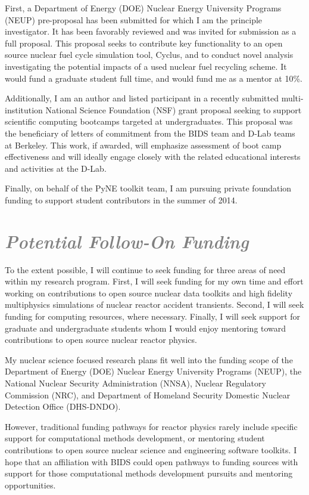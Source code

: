 \documentclass[a4paper, 10pt]{article}
\begin{document}
First, a Department of Energy (DOE) Nuclear Energy University Programs (NEUP) 
pre-proposal has been submitted for which I am the principle investigator. It 
has been favorably reviewed and was invited for submission as a full proposal. 
This proposal seeks to contribute key functionality to an open source nuclear 
fuel cycle simulation tool, Cyclus, and to conduct novel analysis investigating 
the potential impacts of a used nuclear fuel recycling scheme. It would fund a 
graduate student full time, and would fund me as a mentor at 10\%. 

Additionally, I am an author and listed participant in a recently submitted 
multi-institution National Science Foundation (NSF) grant proposal seeking to 
support scientific computing bootcamps targeted at undergraduates. This proposal 
was the beneficiary of letters of commitment from the BIDS team and D-Lab teams 
at Berkeley. This work, if awarded, will emphasize assessment of boot camp 
effectiveness and will ideally engage closely with the related educational 
interests and activities at the D-Lab.

Finally, on behalf of the PyNE toolkit team, I am pursuing private foundation 
funding to support student contributors in the summer of 2014.

\section*{\textcolor{gray}{\it Potential Follow-On Funding }}

To the extent possible, I will continue to seek funding for three areas of need 
within my research program. First, I will seek funding for my own time and 
effort working on contributions to open source nuclear data toolkits and high 
fidelity multiphysics simulations of nuclear reactor accident transients. 
Second, I will seek funding for computing resources, where necessary. Finally, I 
will seek support for graduate and undergraduate students whom I would enjoy 
mentoring toward contributions to open source nuclear reactor physics. 

My nuclear science focused research plans fit well into the funding scope of the 
Department of Energy (DOE) Nuclear Energy University Programs (NEUP), the 
National Nuclear Security Administration (NNSA), Nuclear Regulatory Commission 
(NRC), and Department of Homeland Security Domestic Nuclear Detection Office 
(DHS-DNDO).  

However, traditional funding pathways for reactor physics rarely include 
specific support for computational methods development, or mentoring student 
contributions to open source nuclear science and engineering software toolkits. 
I hope that an affiliation with BIDS could open pathways to funding sources with 
support for those computational methods development pursuits and mentoring opportunities. 
\end{document}
